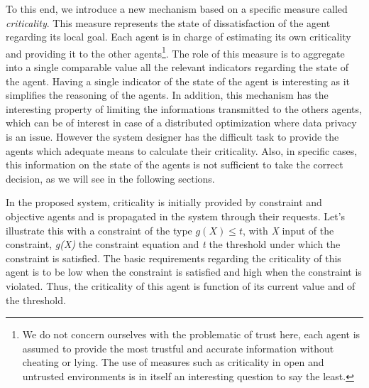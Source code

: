 To this end, we introduce a new mechanism based on a specific measure called \emph{criticality}. This measure represents the state of dissatisfaction of the agent regarding its local goal. Each agent is in charge of estimating its own criticality and providing it to the other agents\footnote{We do not concern ourselves with the problematic of trust here, each agent is assumed to provide the most trustful and accurate information without cheating or lying. The use of measures such as criticality in open and untrusted environments is in itself an interesting question to say the least.}. The role of this measure is to aggregate into a single comparable value all the relevant indicators regarding the state of the agent. Having a single indicator of the state of the agent is interesting as it simplifies the reasoning of the agents. In addition, this mechanism has the interesting property of limiting the informations transmitted to the others agents, which can be of interest in case of a distributed optimization where data privacy is an issue.
However the system designer has the difficult task to provide the agents which adequate means to calculate their criticality. Also, in specific cases, this information on the state of the agents is not sufficient to take the correct decision, as we will see in the following sections.

In the proposed system, criticality is initially provided by constraint and objective agents and is propagated in the system through their requests.
Let's illustrate this with a constraint of the type \(g(X) \leq t\), with \emph{X} input of the constraint, \emph{g(X)} the constraint equation and \emph{t} the threshold under which the constraint is satisfied. The basic requirements regarding the criticality of this agent is to be low when the constraint is satisfied and high when the constraint is violated. Thus, the criticality of this agent is function of its current value and of the threshold.


